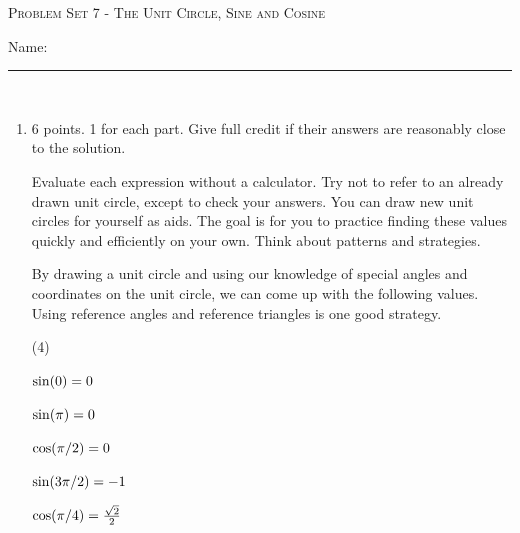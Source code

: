 \documentclass{article}
\begin{document}
\begin{center}
  \large\textsc{Problem Set 7 - The Unit Circle, Sine and Cosine}
  
      \pspace{12pt}
  \begin{problemonly}\large Name: \rule{5cm}{0.15mm}\\ \end{problemonly}
\end{center}


\begin{enumerate}

\item 

\begin{grading}
6 points. 1 for each part. Give full credit if their answers are reasonably close to the solution.
\end{grading}

  Evaluate each expression without a calculator. Try not to refer to an already drawn unit circle, except to check your answers. You can draw new unit circles for yourself as aids. The goal is for you to practice finding these values quickly and efficiently on your own. Think about patterns and strategies.

  \begin{solution}
      By drawing a unit circle and using our knowledge of special angles and coordinates on the unit circle, we can come up with the following values. Using reference angles and reference triangles is one good strategy.
  \end{solution}

  \begin{tasks}[after-item-skip=64pt](4)

    \task 
      \begin{problem}
        $\sin (0)=0$
      \end{problem}

    \task 
      \begin{problem}
        $\sin (\pi)=0$
      \end{problem}


    \task 
      \begin{problem}
        $\cos (\pi/2)=0$
      \end{problem}

    \task 
      \begin{problem}
        $\sin (3\pi/2)=-1$
      \end{problem}
      

    \task 
      \begin{problem}
        $\cos (\pi/4)=\frac{\sqrt{2}}{2}$
      \end{problem}


\end{tasks}
\end{enumerate}
\end{document}
